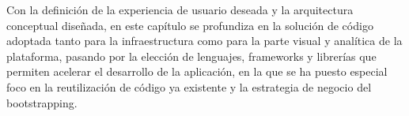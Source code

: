 
Con la definición de la experiencia de usuario deseada y la arquitectura conceptual diseñada, en este capítulo se profundiza en la solución de código adoptada tanto para la infraestructura como para la parte visual y analítica de la plataforma, pasando por la elección de lenguajes, frameworks y librerías que permiten acelerar el desarrollo de la aplicación, en la que se ha puesto especial foco en la reutilización de código ya existente y la estrategia de negocio del bootstrapping.
